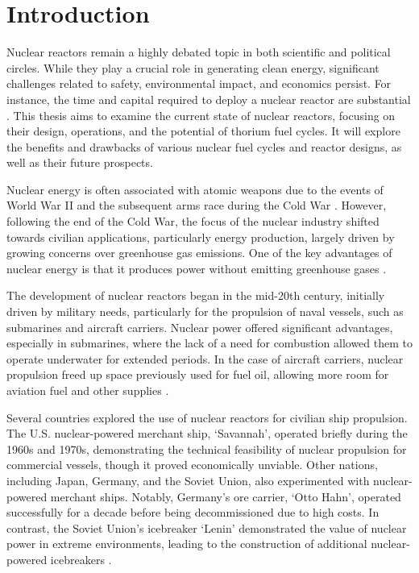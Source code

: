 \chapter{Introduction}

Nuclear reactors remain a highly debated topic in both scientific and political circles. While they play a crucial role in generating clean energy, significant challenges related to safety, environmental impact, and economics persist. For instance, the time and capital required to deploy a nuclear reactor are substantial \cite{Kornecki_Wise_2024}. This thesis aims to examine the current state of nuclear reactors, focusing on their design, operations, and the potential of thorium fuel cycles. It will explore the benefits and drawbacks of various nuclear fuel cycles and reactor designs, as well as their future prospects.

Nuclear energy is often associated with atomic weapons due to the events of World War II and the subsequent arms race during the Cold War \cite{Lamarsh_Baratta_2009}. However, following the end of the Cold War, the focus of the nuclear industry shifted towards civilian applications, particularly energy production, largely driven by growing concerns over greenhouse gas emissions. One of the key advantages of nuclear energy is that it produces power without emitting greenhouse gases \cite{Lamarsh_Baratta_2009}.

The development of nuclear reactors began in the mid-20th century, initially driven by military needs, particularly for the propulsion of naval vessels, such as submarines and aircraft carriers. Nuclear power offered significant advantages, especially in submarines, where the lack of a need for combustion allowed them to operate underwater for extended periods. In the case of aircraft carriers, nuclear propulsion freed up space previously used for fuel oil, allowing more room for aviation fuel and other supplies \cite{Lamarsh_Baratta_2009}.

Several countries explored the use of nuclear reactors for civilian ship propulsion. The U.S. nuclear-powered merchant ship, `Savannah', operated briefly during the 1960s and 1970s, demonstrating the technical feasibility of nuclear propulsion for commercial vessels, though it proved economically unviable. Other nations, including Japan, Germany, and the Soviet Union, also experimented with nuclear-powered merchant ships. Notably, Germany's ore carrier, `Otto Hahn', operated successfully for a decade before being decommissioned due to high costs. In contrast, the Soviet Union's icebreaker `Lenin' demonstrated the value of nuclear power in extreme environments, leading to the construction of additional nuclear-powered icebreakers \cite{Lamarsh_Baratta_2009}.

